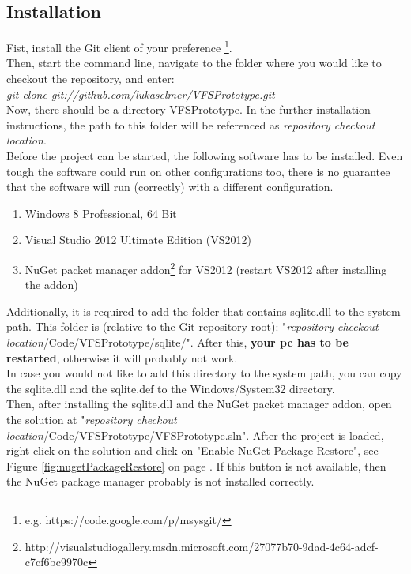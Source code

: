 \documentclass[JCDReport.tex]{subfiles}
\begin{document}
\subsection{Installation}

Fist, install the Git client of your preference \footnote{e.g. https://code.google.com/p/msysgit/}.\\

Then, start the command line, navigate to the folder where you would like to checkout the repository, and enter:\\
\textit{git clone git://github.com/lukaselmer/VFSPrototype.git}\\
Now, there should be a directory VFSPrototype. In the further installation instructions, the path to this folder will be referenced as \textit{repository checkout location}.\\

Before the project can be started, the following software has to be installed. Even tough the software could run on other configurations too, there is no guarantee that the software will run (correctly) with a different configuration.

\begin{enumerate}
\item Windows 8 Professional, 64 Bit
\item Visual Studio 2012 Ultimate Edition (VS2012)
\item NuGet packet manager addon\footnote{http://visualstudiogallery.msdn.microsoft.com/27077b70-9dad-4c64-adcf-c7cf6bc9970c} for VS2012 (restart VS2012 after installing the addon)
\end{enumerate}

Additionally, it is required to add the folder that contains sqlite.dll to the system path. This folder is (relative to the Git repository root): "\textit{repository checkout location}/Code/VFSPrototype/sqlite/". After this, \textbf{your pc has to be restarted}, otherwise it will probably not work.\\
In case you would not like to add this directory to the system path, you can copy the sqlite.dll and the sqlite.def to the Windows/System32 directory.\\

Then, after installing the sqlite.dll and the NuGet packet manager addon, open the solution at "\textit{repository checkout location}/Code/VFSPrototype/VFSPrototype.sln". After the project is loaded, right click on the solution and click on "Enable NuGet Package Restore", see Figure \ref{fig:nugetPackageRestore} on page \pageref{fig:nugetPackageRestore}. If this button is not available, then the NuGet package manager probably is not installed correctly.\\
\end{document}
